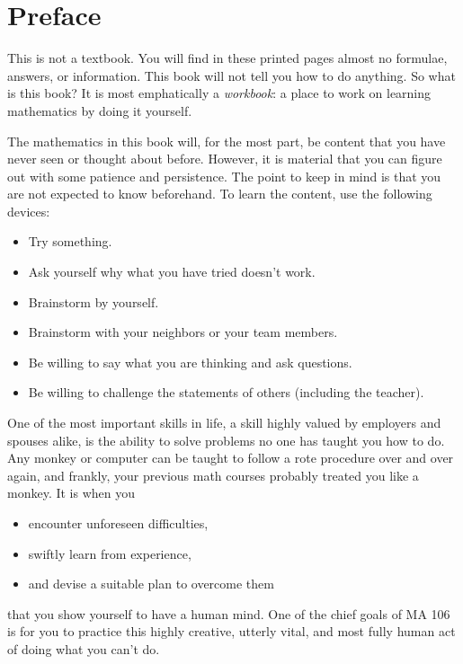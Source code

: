 \chapter*{Preface}\normalsize \label{ch:Preface}

This is not a textbook.
You will find in these printed pages almost no formulae, answers, or information.
This book will not tell you how to do anything.
So what is this book?
It is most emphatically a \emph{workbook}: a place to work on learning mathematics by doing it yourself.

The mathematics in this book will, for the most part, be content that you have never seen or thought about before.  However, it is material that you can figure out with some patience and persistence.  The point to keep in mind is that you are not expected to know beforehand.  To learn the content, use the following devices:
\begin{itemize}
	\item Try something.
	\item Ask yourself why what you have tried doesn't work.
	\item Brainstorm by yourself.
	\item Brainstorm with your neighbors or your team members.
	\item Be willing to say what you are thinking and ask questions.
	\item Be willing to challenge the statements of others (including the teacher).
\end{itemize}

One of the most important skills in life, a skill highly valued by employers and spouses alike,
is the ability to solve problems no one has taught you how to do.
Any monkey or computer can be taught to follow a rote procedure over and over again,
and frankly, your previous math courses probably treated you like a monkey.
It is when you
  \begin{itemize}
		\item encounter unforeseen difficulties,
		\item swiftly learn from experience,
		\item and devise a suitable plan to overcome them
	\end{itemize}
that you show yourself to have a human mind.
One of the chief goals of MA 106
is for you to practice this highly creative, utterly vital, and most fully human act
of doing what you can't do.

